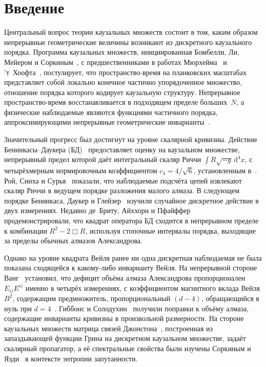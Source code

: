 \documentclass[12pt,a4paper]{article}
\theoremstyle{plain}
\theoremstyle{definition}
\theoremstyle{remark}
\newcommand{\dd}{\mathrm{d}}
\newcommand{\Esq}{E_{ij}E^{ij}}
\begin{document}
\tableofcontents
\newpage

\section{Введение}
\label{sec:intro}

Центральный вопрос теории каузальных множеств состоит в том,
каким образом непрерывные геометрические величины возникают
из дискретного каузального порядка.  Программа каузальных
множеств, инициированная Бомбелли, Ли, Мейером и
Соркиным~\cite{Bombelli:1987aa}, с предшественниками
в работах Мюрхейма~\cite{Myrheim:1978} и
'т~Хоофта~\cite{tHooft:1979},
постулирует, что пространство-время на планковских масштабах
представляет собой локально конечное частично упорядоченное
множество, отношение порядка которого кодирует каузальную
структуру.  Непрерывное пространство-время восстанавливается
в подходящем пределе больших~$N$, а физические наблюдаемые
являются функциями частичного порядка, аппроксимирующими
непрерывные геометрические
инварианты~\cite{Surya:2019ndm}.

Значительный прогресс был достигнут на уровне скалярной
кривизны.  Действие Бенинкасы--Даукера
(БД)~\cite{BenincasaDowker:2010} предоставляет оценку
на каузальном множестве, непрерывный предел которой даёт
интегральный скаляр Риччи
$\int R\sqrt{-g}\,\dd^4x$, с четырёхмерным нормировочным
коэффициентом $c_4 = 4/\sqrt{6}$, установленным
в~\cite{BenincasaDowker:2010,Belenchia:2015}.
Рой, Синха и Сурья~\cite{RoySinhaSurya:2013} показали, что
наблюдаемые подсчёта цепей извлекают скаляр Риччи в ведущем
порядке разложения малого алмаза.  В следующем порядке
Бенинкаса, Даукер и Глейзер~\cite{BenincasaDowkerGlaser:2011}
изучили случайное дискретное действие в двух измерениях.
Недавно де~Бриту, Айххорн и
Пфайффер~\cite{deBrito:2023} продемонстрировали, что квадрат
оператора БД сходится в непрерывном пределе к комбинации
$R^2 - 2\Box R$, используя стопочные интервалы порядка,
выходящие за пределы обычных алмазов Александрова.

Однако на уровне квадрата Вейля ранее ни одна дискретная
наблюдаемая не была показана сходящейся к какому-либо
инварианту Вейля.  На непрерывной стороне Ванг~\cite{Wang:2019}
установил, что дефицит объёма алмаза Александрова
пропорционален~$\Esq$ именно в четырёх измерениях, с
коэффициентом магнитного вклада Вейля $B^2$, содержащим
предмножитель, пропорциональный $(d-4)$, обращающийся в нуль
при $d = 4$~\cite{Wang:2019}.  Гиббонс и
Солодухин~\cite{GibbonsSolodukhin:2007} получили поправки
к объёму алмаза, содержащие инварианты кривизны в произвольной
размерности.  На стороне каузальных множеств матрица связей
Джонстона~\cite{Johnston:2008,Johnston:2010}, построенная из
запаздывающей функции Грина на дискретном каузальном
множестве, задаёт скалярный пропагатор, а её спектральные
свойства были изучены Соркиным и
Язди~\cite{Sorkin:2012,SorkinYazdi:2018} в контексте
энтропии запутанности.
\end{document}
